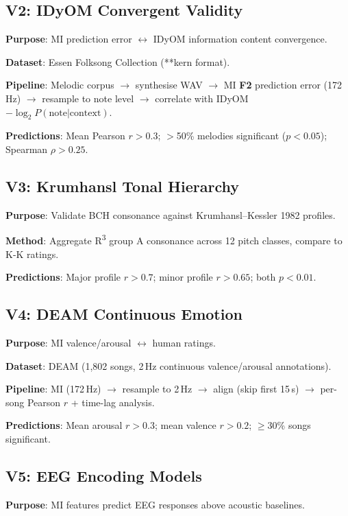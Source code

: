 \documentclass[10pt,twocolumn]{article}
\newcommand{\Rthree}{R\textsuperscript{3}}
\newcommand{\fn}[1]{\textbf{F#1}}
\begin{document}
\subsection{V2: IDyOM Convergent Validity}

\textbf{Purpose}: MI prediction error $\leftrightarrow$ IDyOM information content convergence.

\textbf{Dataset}: Essen Folksong Collection (**kern format).

\textbf{Pipeline}: Melodic corpus $\to$ synthesise WAV $\to$ MI \fn{2} prediction error (172\,Hz) $\to$ resample to note level $\to$ correlate with IDyOM $-\log_2 P(\text{note}|\text{context})$.

\textbf{Predictions}: Mean Pearson $r > 0.3$; $>$50\% melodies significant ($p < 0.05$); Spearman $\rho > 0.25$.

\subsection{V3: Krumhansl Tonal Hierarchy}

\textbf{Purpose}: Validate BCH consonance against Krumhansl--Kessler 1982 profiles.

\textbf{Method}: Aggregate \Rthree{} group A consonance across 12 pitch classes, compare to K-K ratings.

\textbf{Predictions}: Major profile $r > 0.7$; minor profile $r > 0.65$; both $p < 0.01$.

\subsection{V4: DEAM Continuous Emotion}

\textbf{Purpose}: MI valence/arousal $\leftrightarrow$ human ratings.

\textbf{Dataset}: DEAM (1,802 songs, 2\,Hz continuous valence/arousal annotations).

\textbf{Pipeline}: MI (172\,Hz) $\to$ resample to 2\,Hz $\to$ align (skip first 15\,s) $\to$ per-song Pearson $r$ + time-lag analysis.

\textbf{Predictions}: Mean arousal $r > 0.3$; mean valence $r > 0.2$; $\geq$30\% songs significant.

\subsection{V5: EEG Encoding Models}

\textbf{Purpose}: MI features predict EEG responses above acoustic baselines.
\end{document}
